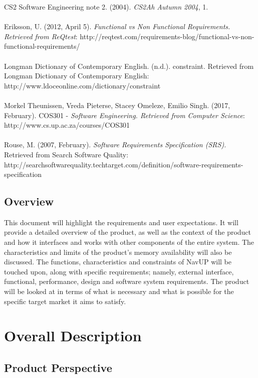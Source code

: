 \documentclass[12pt]{article}
\begin{document}
CS2 Software Engineering note 2. (2004). \textit{CS2Ah Autumn 2004}, 1. \\\\
Eriksson, U. (2012, April 5). \textit{Functional vs Non Functional Requirements. Retrieved from ReQtest}: http://reqtest.com/requirements-blog/functional-vs-non-functional-requirements/ \\\\
Longman Dictionary of Contemporary English. (n.d.). constraint. Retrieved from Longman Dictionary of Contemporary English: http://www.ldoceonline.com/dictionary/constraint \\\\
Morkel Theunissen, Vreda Pieterse, Stacey Omeleze, Emilio Singh. (2017, February). COS301 - \textit{Software Engineering. Retrieved from Computer Science}: http://www.cs.up.ac.za/courses/COS301 \\\\
Rouse, M. (2007, February). \textit{Software Requirements Specification (SRS).} Retrieved from Search Software Quality: http://searchsoftwarequality.techtarget.com/definition/software-requirements-specification





	\subsection{Overview}
This document will highlight the requirements and user expectations. It will provide a detailed overview of the product, as well as the context of the product and how it interfaces and works with other components of the entire system. The characteristics and limits of the product’s memory availability will also be discussed.
\vspace{\baselineskip}
The functions, characteristics and constraints of NavUP will be touched upon, along with specific requirements; namely, external interface, functional, performance, design and software system requirements.
\vspace{\baselineskip}
The product will be looked at in terms of what is necessary and what is possible for the specific target market it aims to satisfy.

\section{Overall Description}
\subsection{Product Perspective}
\end{document}
